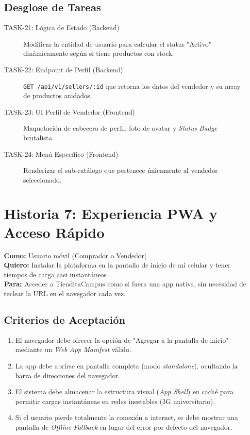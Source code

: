 \documentclass[11pt, letterpaper]{article}
\begin{document}
\begin{description}
    \subsection{Desglose de Tareas}
    \begin{description}
        \item[TASK-21: Lógica de Estado (Backend)] Modificar la entidad de usuario para calcular el status "Activo" dinámicamente según si tiene productos con stock.
        \item[TASK-22: Endpoint de Perfil (Backend)] \texttt{GET /api/v1/sellers/:id} que retorna los datos del vendedor y su array de productos anidados.
        \item[TASK-23: UI Perfil de Vendedor (Frontend)] Maquetación de cabecera de perfil, foto de avatar y \textit{Status Badge} brutalista.
        \item[TASK-24: Menú Específico (Frontend)] Renderizar el sub-catálogo que pertenece únicamente al vendedor seleccionado.
    \end{description}

    \newpage

    \section{Historia 7: Experiencia PWA y Acceso Rápido}

    \begin{tcolorbox}[colback=cyan!5!white,colframe=cyan!75!black,title=HU-07: Instalación como Aplicación Nativa]
        \textbf{Como:} Usuario móvil (Comprador o Vendedor) \\
        \textbf{Quiero:} Instalar la plataforma en la pantalla de inicio de mi celular y tener tiempos de carga casi instantáneos \\
        \textbf{Para:} Acceder a TienditaCampus como si fuera una app nativa, sin necesidad de teclear la URL en el navegador cada vez.
    \end{tcolorbox}

    \subsection{Criterios de Aceptación}
    \begin{enumerate}[label=\bfseries\arabic*.]
        \item El navegador debe ofrecer la opción de "Agregar a la pantalla de inicio" mediante un \textit{Web App Manifest} válido.
        \item La app debe abrirse en pantalla completa (modo \textit{standalone}), ocultando la barra de direcciones del navegador.
        \item El sistema debe almacenar la estructura visual (\textit{App Shell}) en caché para permitir cargas instantáneas en redes inestables (3G universitario).
        \item Si el usuario pierde totalmente la conexión a internet, se debe mostrar una pantalla de \textit{Offline Fallback} en lugar del error por defecto del navegador.
    \end{enumerate}


\end{description}
\end{document}
